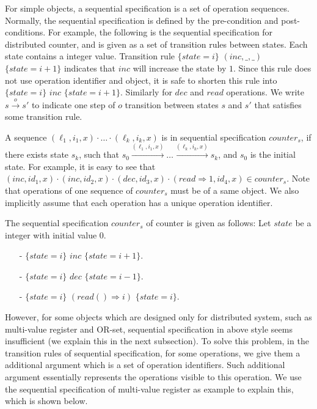 For simple objects, a sequential specification is a set of operation sequences. Normally, the sequential specification is defined by the pre-condition and post-conditions. For example, the following is the sequential specification for distributed counter, and is given as a set of transition rules between states. Each state contains a integer value. Transition rule $\{ \mathit{state} = i \}$ $(\mathit{inc},\_,\_)$ $\{ \mathit{state} = i+1 \}$ indicates that $\mathit{inc}$ will increase the state by $1$. Since this rule does not use operation identifier and object, it is safe to shorten this rule into $\{ \mathit{state} = i \}$ $\mathit{inc}$ $\{ \mathit{state} = i+1 \}$. Similarly for $\mathit{dec}$ and $\mathit{read}$ operations. We write $s {\xrightarrow{o}} s'$ to indicate one step of $o$ transition between states $s$ and $s'$ that satisfies some transition rule. 

A sequence $(\ell_1,i_1,x) \cdot \ldots \cdot (\ell_k,i_k,x)$ is in sequential specification $\mathit{counter}_s$, if there exists state $s_k$, such that $s_0 {\xrightarrow{(\ell_1,i_1,x)}} \ldots {\xrightarrow{(\ell_k,i_k,x)}} s_k$, and $s_0$ is the initial state. For example, it is easy to see that $(\mathit{inc},\mathit{id}_1,x) \cdot (\mathit{inc},\mathit{id}_2,x) \cdot (\mathit{dec},\mathit{id}_3,x) \cdot (\mathit{read} \Rightarrow 1,\mathit{id}_4,x) \in \mathit{counter}_s$. Note that operations of one sequence of $\mathit{counter}_s$ must be of a same object. We also implicitly assume that each operation has a unique operation identifier. 


\begin{example}
\label{definition:sequential specification of counter}
The sequential specification $\mathit{counter}_s$ of counter is given as follows: Let $\mathit{state}$ be a integer with initial value $0$. 

\begin{itemize}
\setlength{\itemsep}{0.5pt}
\item[-] $\{ \mathit{state} = i \}$ $\mathit{inc}$ $\{ \mathit{state} = i+1 \}$.
\item[-] $\{ \mathit{state} = i \}$ $\mathit{dec}$ $\{ \mathit{state} = i-1 \}$.
\item[-] $\{ \mathit{state} = i \}$ $(\mathit{read}() \Rightarrow i)$ $\{ \mathit{state} = i \}$.
\end{itemize}
\end{example} 

However, for some objects which are designed only for distributed system, such as multi-value register and OR-set, sequential specification in above style seems insufficient (we explain this in the next subsection). To solve this problem, in the transition rules of sequential specification, for some operations, we give them a additional argument which is a set of operation identifiers. Such additional argument essentially represents the operations visible to this operation. We use the sequential specification of multi-value register as example to explain this, which is shown below.

